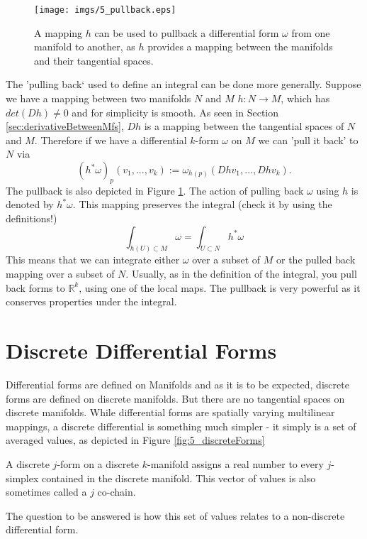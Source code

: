 \begin{figure}%
\begin{center}
\texttt{[image: imgs/5\_pullback.eps]}%
\end{center}
\caption{A mapping $h$ can be used to pullback a differential form $\omega$ from one manifold to another, as $h$ provides a mapping between the manifolds and their tangential spaces. }%
\label{fig:5_pullback}%
\end{figure}

The 'pulling back` used to define an integral can be done more generally. Suppose we have a mapping between two manifolds $N$ and $M$ $h: N\to M$, which has $det(Dh) \neq 0$ and for simplicity  is smooth. As seen in Section \ref{sec:derivativeBetweenMfs}, $Dh$ is a mapping between the tangential spaces of $N$ and $M$. Therefore if we have a differential $k$-form $\omega$ on $M$ we can 'pull it back' to $N$ via
\[(h^*\omega)_p (v_1,...,v_k) := \omega_{h(p)}(Dh v_1,...,Dh v_k). \]
The pullback is also depicted in Figure \ref{fig:5_pullback}. The action of pulling back $\omega$ using $h$ is denoted by $h^* \omega$. This mapping preserves the integral (check it by using the definitions!)
\[\int_{h(U)\subset M} \omega = \int_{U \subset N} h^*\omega \]
This means that we can integrate either $\omega$ over a subset of $M$ or the pulled back mapping over a subset of $N$. Usually, as in the definition of the integral, you pull back forms to $\mathbb R^k$, using one of the local maps.
The pullback is very powerful as it conserves properties under the integral. 

\section{Discrete Differential Forms}

Differential forms are defined on Manifolds and as it is to be expected, discrete forms are defined on discrete manifolds. But there are no tangential spaces on discrete manifolds. While differential forms are spatially varying multilinear mappings, a discrete differential is something much simpler - it simply is a set of averaged values, as depicted in Figure \ref{fig:5_discreteForms}

\begin{definition}
A discrete $j$-form on a discrete $k$-manifold assigns a real number to every $j$-simplex contained in the discrete manifold. This vector of values is also sometimes called a $j$ co-chain. 
\end{definition}
The question to be answered is how this set of values relates to a non-discrete differential form.

